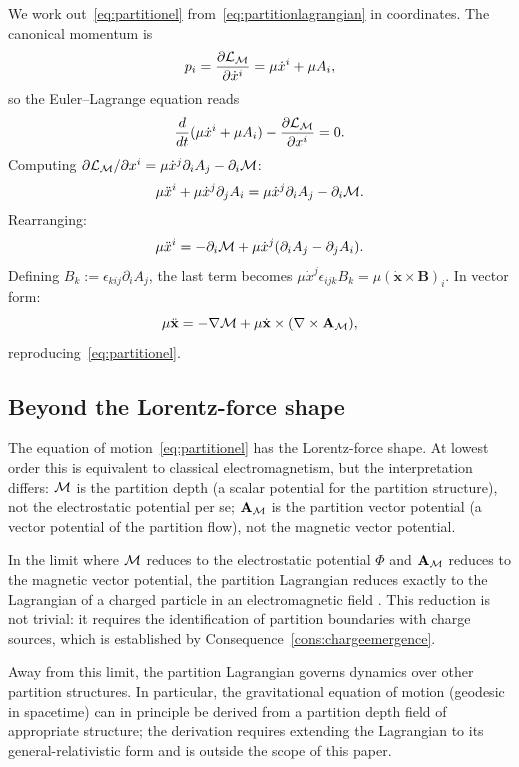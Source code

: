 We work out~\eqref{eq:partitionel} from~\eqref{eq:partitionlagrangian} in coordinates. The canonical momentum is
\begin{equation*}
p_{i}=\frac{\partial\mathcal{L}_{\mathcal{M}}}{\partial\dot{x}^{i}}=\mu\dot{x}^{i}+\mu A_{i},
\end{equation*}
so the Euler--Lagrange equation reads
\begin{equation*}
\frac{d}{dt}(\mu\dot{x}^{i}+\mu A_{i})-\frac{\partial\mathcal{L}_{\mathcal{M}}}{\partial x^{i}}=0.
\end{equation*}
Computing $\partial\mathcal{L}_{\mathcal{M}}/\partial x^{i}=\mu\dot{x}^{j}\partial_{i}A_{j}-\partial_{i}\mathcal{M}$:
\begin{equation*}
\mu\ddot{x}^{i}+\mu\dot{x}^{j}\partial_{j}A_{i}=\mu\dot{x}^{j}\partial_{i}A_{j}-\partial_{i}\mathcal{M}.
\end{equation*}
Rearranging:
\begin{equation*}
\mu\ddot{x}^{i}=-\partial_{i}\mathcal{M}+\mu\dot{x}^{j}(\partial_{i}A_{j}-\partial_{j}A_{i}).
\end{equation*}
Defining $B_{k}:=\epsilon_{kij}\partial_{i}A_{j}$, the last term becomes $\mu\dot{x}^{j}\epsilon_{ijk}B_{k}=\mu(\dot{\mathbf{x}}\times\mathbf{B})_{i}$. In vector form:
\begin{equation}
\mu\ddot{\mathbf{x}}=-\nabla\mathcal{M}+\mu\dot{\mathbf{x}}\times(\nabla\times\mathbf{A}_{\mathcal{M}}),
\end{equation}
reproducing~\eqref{eq:partitionel}.

\subsection{Beyond the Lorentz-force shape}

The equation of motion~\eqref{eq:partitionel} has the Lorentz-force shape. At lowest order this is equivalent to classical electromagnetism, but the interpretation differs: $\mathcal{M}$ is the partition depth (a scalar potential for the partition structure), not the electrostatic potential per se; $\mathbf{A}_{\mathcal{M}}$ is the partition vector potential (a vector potential of the partition flow), not the magnetic vector potential.

In the limit where $\mathcal{M}$ reduces to the electrostatic potential $\Phi$ and $\mathbf{A}_{\mathcal{M}}$ reduces to the magnetic vector potential, the partition Lagrangian reduces exactly to the Lagrangian of a charged particle in an electromagnetic field \citep[Ch. 3]{landaulifshitz1}. This reduction is not trivial: it requires the identification of partition boundaries with charge sources, which is established by Consequence~\ref{cons:chargeemergence}.

Away from this limit, the partition Lagrangian governs dynamics over other partition structures. In particular, the gravitational equation of motion (geodesic in spacetime) can in principle be derived from a partition depth field of appropriate structure; the derivation requires extending the Lagrangian to its general-relativistic form and is outside the scope of this paper.
